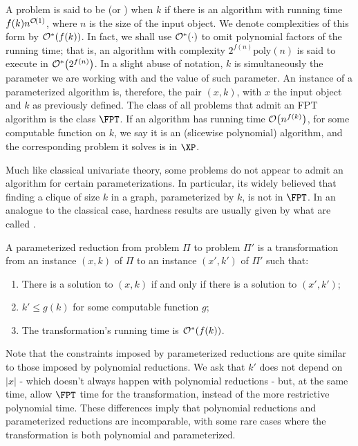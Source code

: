 A problem is said to be  (or \FPT) when  $k$ if there is an algorithm with running time $f(k)n^{\mathcal{O}\!\left(1\right)}$, where $n$ is the size of the input object.
We denote complexities of this form by $\mathcal{O}^*\!\left(f(k)\right)$.
In fact, we shall use $\mathcal{O}^*\!\left(\cdot\right)$ to omit polynomial factors of the running time; that is, an algorithm with complexity $2^{f(n)}\text{poly}(n)$ is said to execute in $\mathcal{O}^*\!\left(2^{f(n)}\right)$.
In a slight abuse of notation, $k$ is simultaneously the parameter we are working with and the value of such parameter.
An instance of a parameterized algorithm is, therefore, the pair $(x,k)$, with $x$ the input object and $k$ as previously defined.
The class of all problems that admit an FPT algorithm is the class $\FPT$.
If an algorithm has running time $\mathcal{O}\!\left(n^{f(k)}\right)$, for some computable function on $k$,  we say it is an \XP (slicewise polynomial) algorithm, and the corresponding problem it solves is in $\XP$. 

Much like classical univariate theory, some problems do not appear to admit an \FPT algorithm for certain parameterizations. In particular, its widely believed that finding a clique of size $k$ in a graph, parameterized by $k$, is not in $\FPT$.
In an analogue to the classical case, hardness results are usually given by what are called .

\begin{class_definition*}
    A parameterized reduction from problem $\Pi$ to problem $\Pi'$ is a transformation from an instance $(x, k)$ of $\Pi$ to an instance $(x',k')$ of $\Pi'$ such that:
    \begin{enumerate}
        \item There is a solution to $(x,k)$ if and only if there is a solution to $(x',k')$;
        \item $k' \leq g(k)$ for some computable function $g$;
        \item The transformation's running time is $\mathcal{O}^*\!\left(f(k)\right)$.
    \end{enumerate}
\end{class_definition*}

Note that the constraints imposed by parameterized reductions are quite similar to those imposed by polynomial reductions.
We ask that $k'$ does not depend on $|x|$ - which doesn't always happen with polynomial reductions - but, at the same time, allow $\FPT$ time for the transformation, instead of the more restrictive polynomial time.
These differences imply that polynomial reductions and parameterized reductions are incomparable, with some rare cases where the transformation is both polynomial and parameterized.

